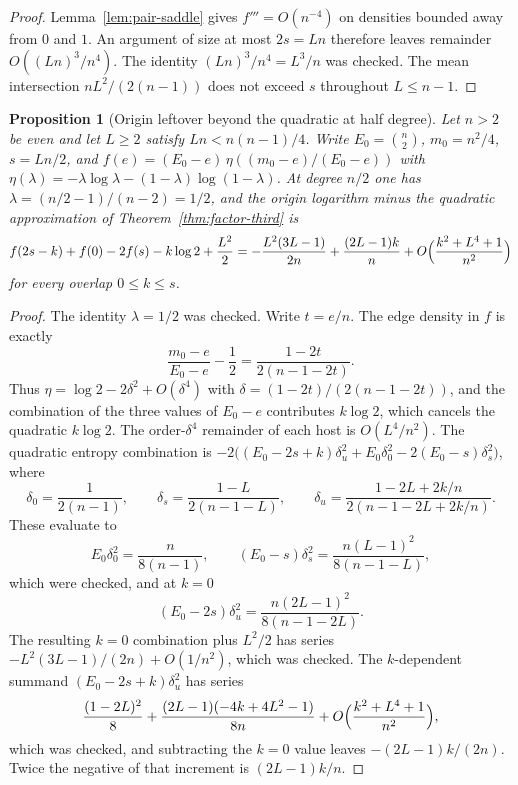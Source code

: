 \documentclass[11pt]{article}
\newtheorem{proposition}[theorem]{Proposition}
\begin{document}
\begin{proof}
Lemma~\ref{lem:pair-saddle} gives \(f'''=O(n^{-4})\) on densities bounded away from \(0\) and \(1\).
An argument of size at most \(2s=Ln\) therefore leaves remainder \(O((Ln)^3/n^4)\).
The identity \((Ln)^3/n^4=L^3/n\) was checked.
The mean intersection \(nL^2/(2(n-1))\) does not exceed \(s\) throughout \(L\le n-1\).
\end{proof}

\begin{proposition}[Origin leftover beyond the quadratic at half degree]
\label{prop:origin-leftover}
Let \(n>2\) be even and let \(L\ge 2\) satisfy \(Ln<n(n-1)/4\). Write \(E_0=\binom{n}{2}\), \(m_0=n^2/4\), \(s=Ln/2\), and \(f(e)=(E_0-e)\,\eta((m_0-e)/(E_0-e))\) with \(\eta(\lambda)=-\lambda\log\lambda-(1-\lambda)\log(1-\lambda)\).
At degree \(n/2\) one has \(\lambda=(n/2-1)/(n-2)=1/2\), and the origin logarithm minus the quadratic approximation of Theorem~\ref{thm:factor-third} is
\[
f(2s-k)+f(0)-2f(s)-k\log 2+\frac{L^2}{2}
=
-\frac{L^2(3L-1)}{2n}+\frac{(2L-1)k}{n}+O\Bigl(\frac{k^2+L^4+1}{n^2}\Bigr)
\]
for every overlap \(0\le k\le s\).
\end{proposition}

\begin{proof}
The identity \(\lambda=1/2\) was checked.
Write \(t=e/n\). The edge density in \(f\) is exactly
\[
\frac{m_0-e}{E_0-e}-\frac12
=
\frac{1-2t}{2(n-1-2t)}.
\]
Thus \(\eta=\log 2-2\delta^2+O(\delta^4)\) with \(\delta=(1-2t)/(2(n-1-2t))\), and the combination of the three values of \(E_0-e\) contributes \(k\log 2\), which cancels the quadratic \(k\log 2\).
The order-\(\delta^4\) remainder of each host is \(O(L^4/n^2)\).
The quadratic entropy combination is \(-2\bigl((E_0-2s+k)\delta_u^2+E_0\delta_0^2-2(E_0-s)\delta_s^2\bigr)\), where
\[
\delta_0=\frac1{2(n-1)},
\qquad
\delta_s=\frac{1-L}{2(n-1-L)},
\qquad
\delta_u=\frac{1-2L+2k/n}{2(n-1-2L+2k/n)}.
\]
These evaluate to
\[
E_0\delta_0^2=\frac{n}{8(n-1)},
\qquad
(E_0-s)\delta_s^2=\frac{n(L-1)^2}{8(n-1-L)},
\]
which were checked, and at \(k=0\)
\[
(E_0-2s)\delta_u^2=\frac{n(2L-1)^2}{8(n-1-2L)}.
\]
The resulting \(k=0\) combination plus \(L^2/2\) has series \(-L^2(3L-1)/(2n)+O(1/n^2)\), which was checked.
The \(k\)-dependent summand \((E_0-2s+k)\delta_u^2\) has series
\[
\frac{(1-2L)^2}{8}+\frac{(2L-1)(-4k+4L^2-1)}{8n}+O\Bigl(\frac{k^2+L^4+1}{n^2}\Bigr),
\]
which was checked, and subtracting the \(k=0\) value leaves \(-(2L-1)k/(2n)\).
Twice the negative of that increment is \((2L-1)k/n\).
\end{proof}
\end{document}

